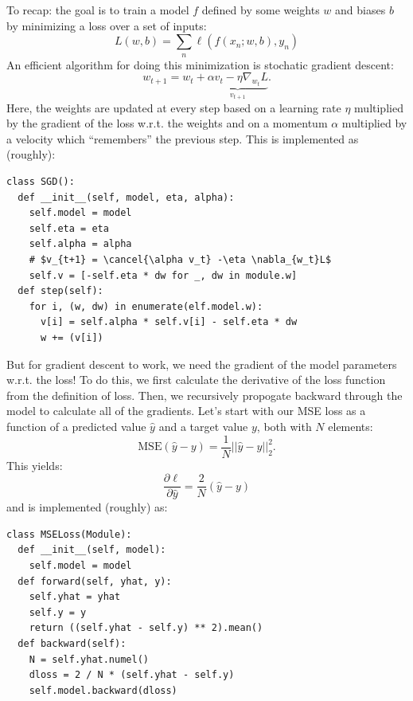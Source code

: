 \documentclass[prl, article, twocolumn]{revtex4-1}
\begin{document}
To recap: the goal is to train a model $f$ defined by some weights $w$ and biases $b$ by minimizing a loss over a set of inputs:
\begin{equation}
    L(w, b) = \sum_{n} \ell(f(x_n; w, b), y_n)
\end{equation}
An efficient algorithm for doing this minimization is stochatic gradient descent:
\begin{equation}
    w_{t+1} = w_{t} + \underbrace{\alpha v_{t} - \eta \nabla_{w_{t}} L}_{v_{t+1}}.
\end{equation}
Here, the weights are updated at every step based on a learning rate $\eta$ multiplied by the gradient of the loss w.r.t. the weights and on a momentum $\alpha$ multiplied by a velocity which ``remembers'' the previous step. This is implemented as (roughly):
\begin{verbatim}
class SGD():
  def __init__(self, model, eta, alpha):
    self.model = model
    self.eta = eta
    self.alpha = alpha
    # $v_{t+1} = \cancel{\alpha v_t} -\eta \nabla_{w_t}L$
    self.v = [-self.eta * dw for _, dw in module.w]
  def step(self):
    for i, (w, dw) in enumerate(elf.model.w):
      v[i] = self.alpha * self.v[i] - self.eta * dw
      w += (v[i])
\end{verbatim}

But for gradient descent to work, we need the gradient of the model parameters w.r.t. the loss! To do this, we first calculate the derivative of the loss function from the definition of loss. Then, we recursively propogate backward through the model to calculate all of the gradients. Let's start with our MSE loss as a function of a predicted value $\hat{y}$ and a target value $y$, both with $N$ elements:
\begin{equation}
    \mathrm{MSE}(\hat{y} - y) = \frac{1}{N}||\hat{y} - y||^2_2.
\end{equation}
This yields:
\begin{equation}
    \frac{\partial{\ell}}{\partial{\hat{y}}} = \frac{2}{N}(\hat{y} - y)
\end{equation}
and is implemented (roughly) as:
\begin{verbatim}
class MSELoss(Module):
  def __init__(self, model):
    self.model = model
  def forward(self, yhat, y):
    self.yhat = yhat
    self.y = y
    return ((self.yhat - self.y) ** 2).mean()
  def backward(self):
    N = self.yhat.numel()
    dloss = 2 / N * (self.yhat - self.y)
    self.model.backward(dloss)
\end{verbatim}
\end{document}

